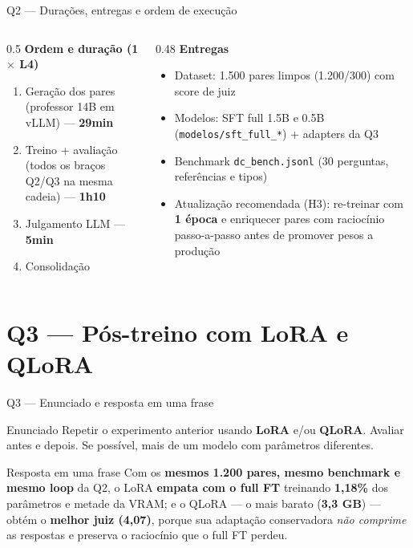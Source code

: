 \documentclass[10pt,aspectratio=169]{beamer}
\newcommand{\ganho}[1]{\textcolor{okgreen}{\textbf{#1}}}
\begin{document}
\begin{frame}{Q2 — Durações, entregas e ordem de execução}
  \begin{columns}[T]
    \begin{column}{0.5\textwidth}
      \textbf{Ordem e duração (1$\times$ L4)}
      \begin{enumerate}\small
        \item Geração dos pares (professor 14B em vLLM) — \textbf{29min}
        \item Treino + avaliação (todos os braços Q2/Q3 na mesma cadeia) — \textbf{1h10}
        \item Julgamento LLM — \textbf{5min}
        \item Consolidação
      \end{enumerate}
    \end{column}
    \begin{column}{0.48\textwidth}
      \textbf{Entregas}
      \begin{itemize}\small
        \item Dataset: 1.500 pares limpos (1.200/300) com score de juiz
        \item Modelos: SFT full 1.5B e 0.5B (\texttt{modelos/sft\_full\_*}) + adapters da Q3
        \item Benchmark \texttt{dc\_bench.jsonl} (30 perguntas, referências e tipos)
        \item Atualização recomendada (H3): re-treinar com \textbf{1 época} e enriquecer pares com raciocínio passo-a-passo antes de promover pesos a produção
      \end{itemize}
    \end{column}
  \end{columns}
\end{frame}

\section{Q3 — Pós-treino com LoRA e QLoRA}

\begin{frame}{Q3 — Enunciado e resposta em uma frase}
  \begin{block}{Enunciado}
    Repetir o experimento anterior usando \textbf{LoRA} e/ou \textbf{QLoRA}. Avaliar antes e depois.
    Se possível, mais de um modelo com parâmetros diferentes.
  \end{block}
  \vspace{4pt}
  \begin{alertblock}{Resposta em uma frase}
    Com os \textbf{mesmos 1.200 pares, mesmo benchmark e mesmo loop} da Q2, o LoRA
    \textbf{empata com o full FT} treinando \ganho{1,18\%} dos parâmetros e metade da VRAM;
    e o QLoRA — o mais barato (\ganho{3,3 GB}) — obtém o \textbf{melhor juiz (4,07)}, porque
    sua adaptação conservadora \emph{não comprime} as respostas e preserva o raciocínio
    que o full FT perdeu.
  \end{alertblock}
\end{frame}
\end{document}
